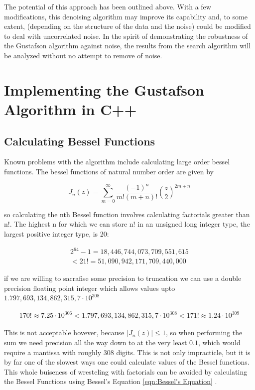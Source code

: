 \documentclass[onecolumn, groupedaddress, 10pt]{revtex4-1}
\begin{document}
The potential of this approach has been outlined above. With a few modifications, this denoising algorithm may improve its capability and, to some extent, (depending on the structure of the data and the noise) could be modified to deal with uncorrelated noise. In the spirit of demonstrating the robustness of the Gustafson algorithm against noise, the results from the search algorithm will be analyzed without no attempt to remove of noise.

\section{Implementing the Gustafson Algorithm in C++}
\subsection{Calculating Bessel Functions}
Known problems with the algorithm include calculating large order bessel functions.  The bessel functions of natural number order are given by

\begin{equation}
J_n(z) = \sum_{m=0}^{\infty} \frac{(-1)^n}{m!(m+n)!} \left( \frac{z}{2} \right)^{2m+n}
\end{equation}

so calculating the nth Bessel function involves calculating factorials greater than n!.  The highest n for which we can store n! in an unsigned long integer type, the largest positive integer type, is 20:

\begin{align}
2^{64}-1 = 18,446,744,073,709,551,615 \\
< 21! = 51,090,942,171,709,440,000
\end{align}

if we are willing to sacrafise some precision to truncation we can use a double precision floating point integer which allows values upto $1.797,693,134,862,315,7 \cdot 10^{308}$

\begin{align}
170! \approx 7.25 \cdot 10^{306}
< 1.797,693,134,862,315,7 \cdot 10^{308} <
171! \approx 1.24 \cdot 10^{309}
\end{align}

This is not acceptable hovever, because $\left| J_n(z) \right| \leq 1$, so when performing the sum we need precision all the way down to at the very least $0.1$, which would require a mantissa with roughly $308$ digits.  This is not only impracticle, but it is by far one of the slowest ways one could calculate values of the Bessel functions.  This whole buiseness of wresteling with factorials can be avoided by calculating the Bessel Functions using Bessel's Equation \ref{eqn:Bessel's Equation} \citep{folland}.
\end{document}
